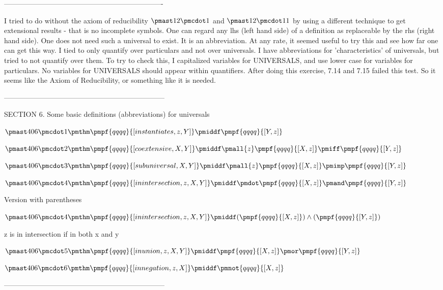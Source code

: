 \documentclass[12pt]{article}
\begin{document}
-------------------------------------------------------------------

I tried to do without the axiom of reducibility $\pmast 12 \pmcdot 1$ and $\pmast 12 \pmcdot 11$ by using a different technique to get extensional results - that is no incomplete symbols. One can regard any lhs (left hand side) of a  definition as replaceable by the rhs (right hand side). One does not need such a universal to exist. It is an abbreviation. At any rate, it seemed useful to try this and see how far one can get this way. I tied to only quantify over particulars and not over universals. I have abbreviations for 'characteristics' of universals, but tried to not quantify over them. To try to check this, I capitalized variables for UNIVERSALS, and use lower case for variables for particulars. No variables for UNIVERSALS should appear within quantifiers. After doing this exercise, 7.14 and 7.15 failed this test. So it seems like the Axiom of Reducibility, or something like it is needed.

--------------------------------------------------------------------

SECTION 6. Some basic definitions (abbreviations) for universals

$\pmast 406 \pmcdot 1 \pmthm \pmpf{qqqq}{[instantiates, z, Y]} \pmiddf \pmpf {qqqq}{[Y, z]} $

$\pmast 406 \pmcdot 2 \pmthm \pmpf{qqqq}{[coextensive, X, Y]} \pmiddf \pmall{z} \pmpf{qqqq}{[X,z]} \pmiff \pmpf{qqqq}{[Y,z]} $

$\pmast 406 \pmcdot 3 \pmthm \pmpf{qqqq}{[subuniversal, X, Y]} \pmiddf \pmall{z} \pmpf{qqqq}{[X, z]}  \pmimp \pmpf{qqqq}{[Y, z]} $

$\pmast 406 \pmcdot 4 \pmthm \pmpf{qqqq}{[inintersection,z, X, Y]} \pmiddf \pmdot \pmpf{qqqq}{[X,z]} \pmand \pmpf{qqqq}{[Y,z]} $
 
 

Version with parentheses

$\pmast 406 \pmcdot 4 \pmthm \pmpf{qqqq}{[inintersection,z, X, Y]} \pmiddf  (  \pmpf{qqqq}{[X,z]} ) \land ( \pmpf{qqqq}{[Y,z]} )$


z is in intersection if in both x and y

$\pmast 406 \pmcdot 5 \pmthm \pmpf{qqqq}{[inunion,z, X, Y]} \pmiddf \pmpf{qqqq}{[X,z]} \pmor \pmpf{qqqq}{[Y,z]} $

$\pmast 406 \pmcdot 6 \pmthm \pmpf{qqqq}{[innegation, z, X]} \pmiddf \pmnot {qqqq}{[X, z]} $

--------------------------------------------------------------------
\end{document}
